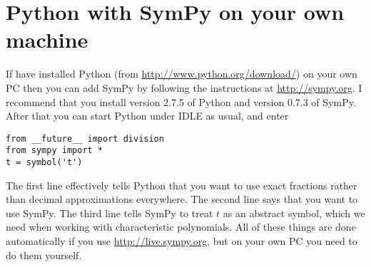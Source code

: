 \documentclass{amsart}
\begin{document}
\section*{Python with SymPy on your own machine}

If have installed Python (from \url{http://www.python.org/download/})
on your own PC then you can add SymPy by following the instructions at
\url{http://sympy.org}.  I recommend that you install version 2.7.5 of
Python and version 0.7.3 of SymPy.  After that you can start Python
under IDLE as usual, and enter  
\begin{verbatim}
from __future__ import division
from sympy import *
t = symbol('t')
\end{verbatim}
The first line effectively tells Python that you want to use exact
fractions rather than decimal approximations everywhere.  The second
line says that you want to use SymPy.  The third line tells SymPy to
treat $t$ as an abstract symbol, which we need when working with
characteristic polynomials.  All of these things are done
automatically if you use \url{http://live.sympy.org}, but on your own
PC you need to do them yourself.
\end{document}
